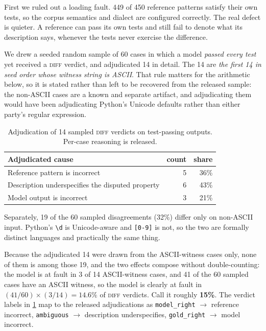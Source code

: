 \documentclass[11pt]{article}
\begin{document}
First we ruled out a loading fault. 449 of 450 reference patterns satisfy
their own tests, so the corpus semantics and dialect are configured correctly.
The real defect is quieter. A reference can pass its own tests and still fail
to denote what its description says, whenever the tests never exercise the
difference.

We drew a seeded random sample of 60 cases in which a model \emph{passed
every test} yet received a \textsc{diff} verdict, and adjudicated 14 in
detail. The 14 are \emph{the first 14 in seed order whose witness string is
ASCII}. That rule matters for the arithmetic below, so it is stated rather
than left to be recovered from the released sample: the non-ASCII cases are a
known and separate artifact, and adjudicating them would have been
adjudicating Python's Unicode defaults rather than either party's regular
expression.

\begin{table}[htbp]
\centering
\small
\begin{tabular}{lrr}
\toprule
Adjudicated cause & count & share \\
\midrule
Reference pattern is incorrect & 5 & 36\% \\
Description underspecifies the disputed property & 6 & 43\% \\
Model output is incorrect & 3 & 21\% \\
\bottomrule
\end{tabular}
\caption{Adjudication of 14 sampled \textsc{diff} verdicts on test-passing
outputs. Per-case reasoning is released.}
\label{tab:adjudication}
\end{table}

Separately, 19 of the 60 sampled disagreements (32\%) differ only on
non-ASCII input. Python's \texttt{\textbackslash d} is Unicode-aware and
\texttt{[0-9]} is not, so the two are formally distinct languages and
practically the same thing.

Because the adjudicated 14 were drawn from the ASCII-witness cases only, none
of them is among those 19, and the two effects compose without
double-counting: the model is at fault in 3 of 14 ASCII-witness cases, and
41 of the 60 sampled cases have an ASCII witness, so the model is clearly at
fault in $(41/60) \times (3/14) = 14.6\%$ of \textsc{diff} verdicts. Call it
roughly \textbf{15\%}. The verdict labels in \cref{tab:adjudication} map to
the released adjudications as \texttt{model\_right} $\to$ reference
incorrect, \texttt{ambiguous} $\to$ description underspecifies,
\texttt{gold\_right} $\to$ model incorrect.
\end{document}
